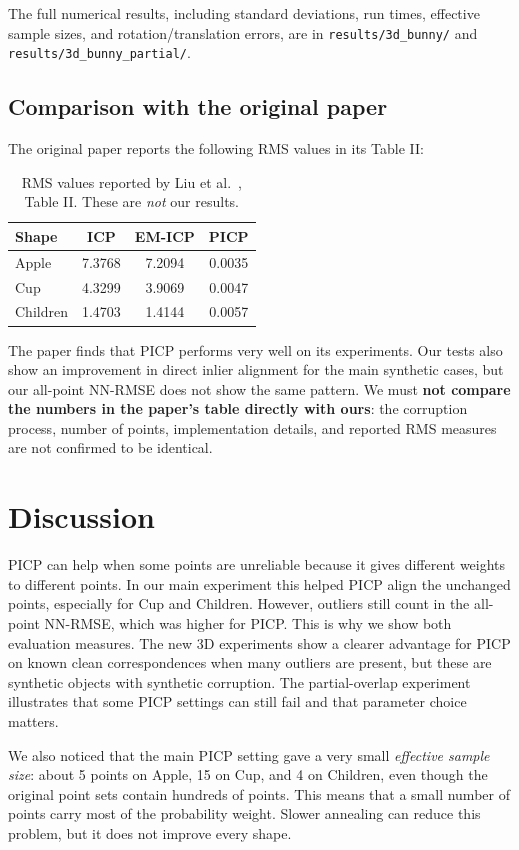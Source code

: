 \documentclass[11pt,a4paper]{article}
\begin{document}
The full numerical results, including standard deviations, run times,
effective sample sizes, and rotation/translation errors, are in
\texttt{results/3d\_bunny/} and \texttt{results/3d\_bunny\_partial/}.

\subsection{Comparison with the original paper}
The original paper reports the following RMS values in its Table II:

\begin{table}[H]
\centering
\caption{RMS values reported by Liu et al.~\cite{liu2014}, Table II. These are \emph{not} our results.}
\small
\begin{tabular}{lccc}
\toprule
Shape & ICP & EM-ICP & PICP \\
\midrule
Apple & 7.3768 & 7.2094 & 0.0035 \\
Cup & 4.3299 & 3.9069 & 0.0047 \\
Children & 1.4703 & 1.4144 & 0.0057 \\
\bottomrule
\end{tabular}
\end{table}

The paper finds that PICP performs very well on its experiments. Our tests
also show an improvement in direct inlier alignment for the main synthetic
cases, but our all-point NN-RMSE does not show the same pattern. We must
\textbf{not compare the numbers in the paper's table directly with ours}:
the corruption process, number of points, implementation details, and reported
RMS measures are not confirmed to be identical.

\section{Discussion}
PICP can help when some points are unreliable because it gives different
weights to different points. In our main experiment this helped PICP align
the unchanged points, especially for Cup and Children. However, outliers still
count in the all-point NN-RMSE, which was higher for PICP. This is why we
show both evaluation measures. The new 3D experiments show a clearer
advantage for PICP on known clean correspondences when many outliers are
present, but these are synthetic objects with synthetic corruption. The
partial-overlap experiment illustrates that some PICP settings can still
fail and that parameter choice matters.

We also noticed that the main PICP setting gave a very small \emph{effective
sample size}: about 5 points on Apple, 15 on Cup, and 4 on Children, even
though the original point sets contain hundreds of points. This means that
a small number of points carry most of the probability weight. Slower
annealing can reduce this problem, but it does not improve every shape.
\end{document}

